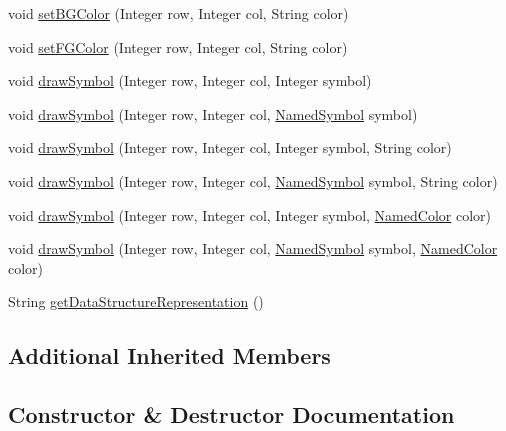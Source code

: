 \begin{DoxyCompactItemize}
void \hyperlink{classbridges_1_1base_1_1_game_grid_ad655bef3f2c24cc19f222b86b5d31373}{set\+B\+G\+Color} (Integer row, Integer col, String color)
\item 
void \hyperlink{classbridges_1_1base_1_1_game_grid_a860f2669ba46bc7691f4bb5c7adf907b}{set\+F\+G\+Color} (Integer row, Integer col, String color)
\item 
void \hyperlink{classbridges_1_1base_1_1_game_grid_a8eee4918e2cbfc956a92a39252590114}{draw\+Symbol} (Integer row, Integer col, Integer symbol)
\item 
void \hyperlink{classbridges_1_1base_1_1_game_grid_a8e8f99d386149e9cd888dd9e6796e5e0}{draw\+Symbol} (Integer row, Integer col, \hyperlink{enumbridges_1_1base_1_1_named_symbol}{Named\+Symbol} symbol)
\item 
void \hyperlink{classbridges_1_1base_1_1_game_grid_a89a27cff9fd390f6d824b7e71534b256}{draw\+Symbol} (Integer row, Integer col, Integer symbol, String color)
\item 
void \hyperlink{classbridges_1_1base_1_1_game_grid_a998fd9e2a9a64e290c9edb01d49f324a}{draw\+Symbol} (Integer row, Integer col, \hyperlink{enumbridges_1_1base_1_1_named_symbol}{Named\+Symbol} symbol, String color)
\item 
void \hyperlink{classbridges_1_1base_1_1_game_grid_ad791794e65de113d96dbd173b34ae820}{draw\+Symbol} (Integer row, Integer col, Integer symbol, \hyperlink{enumbridges_1_1base_1_1_named_color}{Named\+Color} color)
\item 
void \hyperlink{classbridges_1_1base_1_1_game_grid_a778e5b036a18278c9e93e01faa19421c}{draw\+Symbol} (Integer row, Integer col, \hyperlink{enumbridges_1_1base_1_1_named_symbol}{Named\+Symbol} symbol, \hyperlink{enumbridges_1_1base_1_1_named_color}{Named\+Color} color)
\item 
String \hyperlink{classbridges_1_1base_1_1_game_grid_a3c72c7277f9c72ceff82fd063298541e}{get\+Data\+Structure\+Representation} ()
\end{DoxyCompactItemize}
\subsection*{Additional Inherited Members}


\subsection{Constructor \& Destructor Documentation}
\mbox{\label{classbridges_1_1base_1_1_game_grid_a0b5330e66b504eddc00617c5f1fa6240}} 
